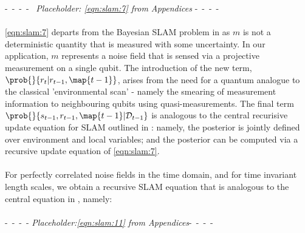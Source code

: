 -~-~-~-~  \textit{Placeholder: \cref{eqn:slam:7} from Appendices} -~-~-~-~  \\
\\
\cref{eqn:slam:7} departs from the Bayesian SLAM problem in \cite{thrun2001probabilistic} as $m$ is not a deterministic quantity that is measured with some uncertainty. In our application, $m$ represents a noise field that is sensed via a projective measurement on a single qubit. The introduction of the new term, $ \prob{}{ r_t|  r_{t-1}, \map{t-1}}$, arises from the need for a quantum analogue to the classical 'environmental scan' - namely the smearing of measurement information to neighbouring qubits using quasi-measurements. The final term $\prob{}{s_{t-1}, r_{t-1}, \map{t-1}| \mathcal{D}_{t-1}}$ is analogous to the central recurisive update equation for SLAM outlined in \cite{thrun2001probabilistic}: namely, the posterior is jointly defined over environment and local variables; and the posterior can be computed via a recursive update equation of \cref{eqn:slam:7}. \\
\\
For perfectly correlated noise fields in the time domain, and for time invariant length scales, we obtain a recursive SLAM equation that is analogous to the central equation in \cite{thrun2001probabilistic}, namely:\\
\\
-~-~-~- \textit{Placeholder:\cref{eqn:slam:11} from Appendices}-~-~-~-  \\
\\

